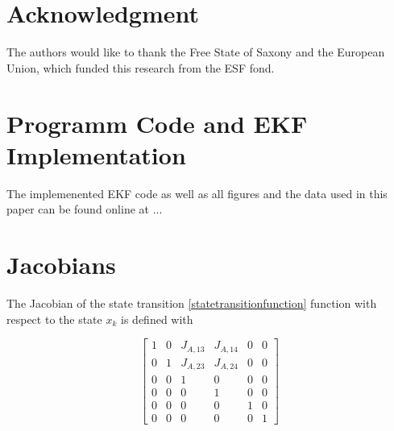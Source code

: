 \documentclass[conference]{IEEEtran}
\begin{document}

%

\section*{Acknowledgment}

The authors would like to thank the Free State of Saxony and the European Union, which funded this research from the ESF fond.

\appendices
\section{Programm Code and EKF Implementation}
The implemenented EKF code as well as all figures and the data used in this paper can be found online at ... %

\section{Jacobians}

The Jacobian of the state transition \eqref{statetransitionfunction} function with respect to the state $x_k$ is defined with

\begin{equation}\left[\begin{matrix}1 & 0 & J_{A,13} & J_{A,14} & 0 & 0\\0 & 1 & J_{A,23} & J_{A,24} & 0 & 0\\0 & 0 & 1 & 0 & 0 & 0\\0 & 0 & 0 & 1 & 0 & 0\\0 & 0 & 0 & 0 & 1 & 0\\0 & 0 & 0 & 0 & 0 & 1\end{matrix}\right]\end{equation}
\end{document}
